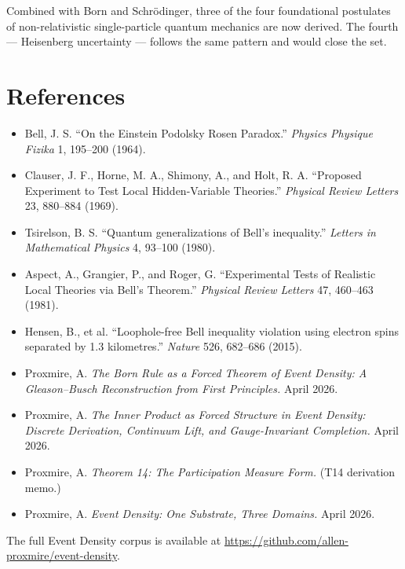 \documentclass[11pt,a4paper]{article}
\begin{document}
Combined with Born and Schr\"odinger, three of the four foundational postulates of non-relativistic single-particle quantum mechanics are now derived. The fourth --- Heisenberg uncertainty --- follows the same pattern and would close the set.

\section*{References}

\begin{itemize}[leftmargin=*,itemsep=2pt]
  \item Bell, J. S. ``On the Einstein Podolsky Rosen Paradox.'' \emph{Physics Physique Fizika} 1, 195--200 (1964).
  \item Clauser, J. F., Horne, M. A., Shimony, A., and Holt, R. A. ``Proposed Experiment to Test Local Hidden-Variable Theories.'' \emph{Physical Review Letters} 23, 880--884 (1969).
  \item Tsirelson, B. S. ``Quantum generalizations of Bell's inequality.'' \emph{Letters in Mathematical Physics} 4, 93--100 (1980).
  \item Aspect, A., Grangier, P., and Roger, G. ``Experimental Tests of Realistic Local Theories via Bell's Theorem.'' \emph{Physical Review Letters} 47, 460--463 (1981).
  \item Hensen, B., et al. ``Loophole-free Bell inequality violation using electron spins separated by 1.3 kilometres.'' \emph{Nature} 526, 682--686 (2015).
  \item Proxmire, A. \emph{The Born Rule as a Forced Theorem of Event Density: A Gleason--Busch Reconstruction from First Principles.} April 2026.
  \item Proxmire, A. \emph{The Inner Product as Forced Structure in Event Density: Discrete Derivation, Continuum Lift, and Gauge-Invariant Completion.} April 2026.
  \item Proxmire, A. \emph{Theorem 14: The Participation Measure Form.} (T14 derivation memo.)
  \item Proxmire, A. \emph{Event Density: One Substrate, Three Domains.} April 2026.
\end{itemize}

The full Event Density corpus is available at \url{https://github.com/allen-proxmire/event-density}.
\end{document}
